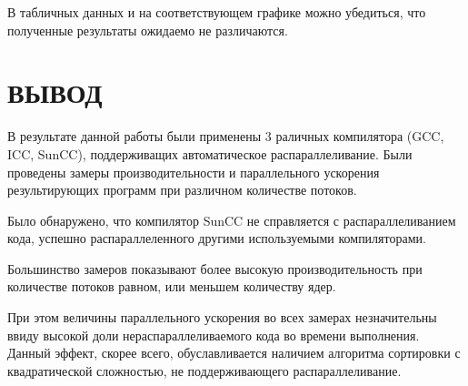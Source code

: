\documentclass[14pt, a4paper, oneside, final]{extarticle}
\begin{document}
В табличных данных и на соответствующем графике можно убедиться, что полученные результаты ожидаемо не различаются.

\clearpage
\section*{ВЫВОД}
В результате данной работы были применены 3 раличных компилятора (GCC, ICC, SunCC), поддерживащих автоматическое распараллеливание. Были проведены замеры производительности и параллельного ускорения результирующих программ при различном количестве потоков.

Было обнаружено, что компилятор SunCC не справляется с распараллеливанием кода, успешно распараллеленного другими используемыми компиляторами.

Большинство замеров показывают более высокую производительность при количестве потоков равном, или меньшем количеству ядер.

При этом величины параллельного ускорения во всех замерах незначительны ввиду высокой доли нераспараллеливаемого кода во времени выполнения. Данный эффект, скорее всего, обуславливается наличием алгоритма сортировки с квадратической сложностью, не поддерживающего распараллеливание.
\end{document}
